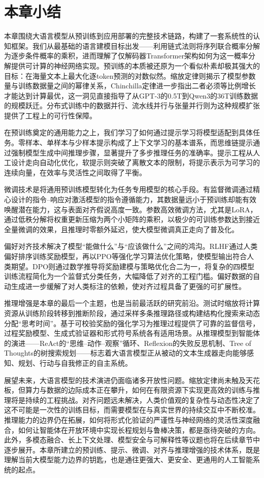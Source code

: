 \section{本章小结}

本章围绕大语言模型从预训练到应用部署的完整技术链路，构建了一套系统性的认知框架。我们从最基础的语言建模目标出发——利用链式法则将序列联合概率分解为逐步条件概率的乘积，进而理解了仅解码器Transformer架构如何为这一概率分解提供可计算的神经网络实现。预训练的本质被还原为一个看似朴素却极其强大的目标：在海量文本上最大化逐token预测的对数似然。缩放定律则揭示了模型参数量与训练数据量之间的幂律关系，Chinchilla定律进一步指出二者必须等比例增长才能达到计算最优，这一洞见直接指导了从GPT-3的0.5T到Qwen3的36T训练数据的规模跃迁。分布式训练中的数据并行、流水线并行与张量并行则为这种规模扩张提供了工程上的可行性保障。

在预训练奠定的通用能力之上，我们学习了如何通过提示学习将模型适配到具体任务。零样本、单样本与少样本提示构成了上下文学习的基本谱系，而思维链提示通过强制模型生成中间推理步骤，显著提升了多步推理任务的准确率。提示工程从人工设计走向自动化优化，软提示则突破了离散文本的限制，将提示表示为可学习的连续向量，在效率与灵活性之间取得了平衡。

微调技术是将通用预训练模型转化为任务专用模型的核心手段。有监督微调通过精心设计的指令--响应对激活模型的指令遵循能力，其数据量远小于预训练却能有效唤醒潜在能力，这与表面对齐假说高度一致。参数高效微调方法，尤其是LoRA，通过低秩分解将权重更新压缩为两个小矩阵的乘积，以极少的可训练参数达到接近全量微调的效果，且推理时零额外延迟，使大模型微调真正走向了普及化。

偏好对齐技术解决了模型``能做什么''与``应该做什么''之间的鸿沟。RLHF通过人类偏好排序训练奖励模型，再以PPO等强化学习算法优化策略，使模型输出符合人类期望。DPO则通过数学推导将奖励建模与策略优化合二为一，将复杂的四模型训练流程简化为一个监督式分类任务，大幅降低了对齐的工程门槛。偏好数据的自动生成进一步缓解了对人类标注的依赖，使对齐过程具备了更强的可扩展性。

推理增强是本章的最后一个主题，也是当前最活跃的研究前沿。测试时缩放将计算资源从训练阶段转移到推断阶段，通过采样多条推理路径或构建结构化搜索来动态分配``思考时间''。基于可校验奖励的强化学习为推理过程提供了可靠的监督信号，过程奖励模型、生成式验证器和形式符号系统各有适用场景。从推理模型到智能体的演进——ReAct的``思维--动作--观察''循环、Reflexion的失败反思机制、Tree of Thoughts的树搜索规划——标志着大语言模型正从被动的文本生成器走向能够感知、规划、行动与自我修正的自主系统。

展望未来，大语言模型的技术演进仍面临诸多开放性问题。缩放定律尚未触及天花板，但算力与数据的边际成本正在攀升，如何在有限资源下实现更高效的训练与推理将是持续的工程挑战。对齐问题远未解决，人类价值观的复杂性与动态性决定了这不可能是一次性的训练目标，而需要模型在与真实世界的持续交互中不断校准。推理能力的边界仍在拓展，如何将形式化验证的严谨性与神经网络的灵活性深度融合，如何让智能体在开放环境中实现长程规划与鲁棒决策，都是亟待突破的方向。此外，多模态融合、长上下文处理、模型安全与可解释性等议题也将在后续章节中逐步展开。本章所建立的预训练、提示、微调、对齐与推理增强的技术体系，既是理解当前大模型能力边界的钥匙，也是通往更强大、更安全、更通用的人工智能系统的起点。



